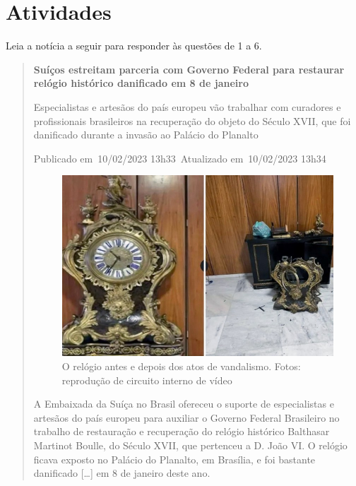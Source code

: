 \section{Atividades}

Leia a notícia a seguir para responder às questões de 1 a 6.


\begin{quote}
\textbf{Suíços estreitam parceria com Governo Federal para restaurar
relógio histórico danificado em 8 de janeiro}

Especialistas e artesãos do país europeu vão trabalhar com curadores e
profissionais brasileiros na recuperação do objeto do Século XVII, que
foi danificado durante a invasão ao Palácio do Planalto

Publicado em~10/02/2023 13h33~Atualizado em~10/02/2023 13h34

\begin{figure}[htpb!]
\centering
\includegraphics[width=\textwidth]{./_SAEB_9_POR/media/image8.jpeg}
\caption{O relógio antes e depois dos atos de vandalismo. Fotos: reprodução de
circuito interno de vídeo}
\end{figure}

A Embaixada da Suíça no Brasil ofereceu o suporte de especialistas e
artesãos do país europeu para auxiliar o Governo Federal Brasileiro no
trabalho de restauração e recuperação do relógio histórico Balthasar
Martinot Boulle, do Século XVII, que pertenceu a D. João VI. O relógio
ficava exposto no Palácio do Planalto, em Brasília, e foi bastante
danificado {[}\ldots{}{]} em 8 de janeiro deste ano.


\end{quote}
